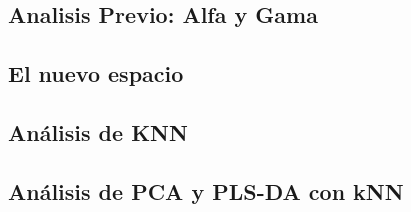 \subsection{Analisis Previo: Alfa y Gama}


\newpage
\subsection{El nuevo espacio}\label{resultados_new-space}


\newpage
\subsection{Análisis de KNN}\label{resultados_knn}


\newpage
\subsection{Análisis de PCA y PLS-DA con kNN}


